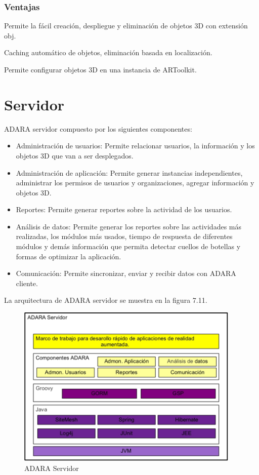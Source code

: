 \documentclass[12pt,a4paper,spanish,openany]{book}
\begin{document}
\subsubsection{Ventajas}
Permite la fácil creación, despliegue y eliminación de objetos 3D con extensión
obj.

Caching automático de objetos, eliminación basada en localización.

Permite configurar objetos 3D en una instancia de ARToolkit.


\section{Servidor}


ADARA servidor compuesto por los siguientes componentes:

\begin{itemize}
  \item Administración de usuarios: Permite relacionar usuarios, la información
  y los objetos 3D que van a ser desplegados.
  \item Administración de aplicación: Permite generar instancias independientes,
  administrar los permisos de usuarios y organizaciones, agregar información y
  objetos 3D.
  \item Reportes: Permite generar reportes sobre la actividad de los usuarios.
  \item Análisis de datos: Permite generar los reportes sobre las actividades
  más realizadas, los módulos más usados, tiempo de respuesta de diferentes
  módulos y demás información que permita detectar cuellos de botellas y formas
  de optimizar la aplicación.  
\item Comunicación: Permite sincronizar, enviar y recibir datos con ADARA
cliente.
\end{itemize}

La arquitectura de ADARA servidor se muestra en la figura 7.11.

\begin{figure}[ht]
\begin{center}
 \includegraphics[width=0.95\textwidth]{./img/ADARAServidor.jpg}
\caption{ADARA Servidor}
\end{center}
\end{figure}
\end{document}
